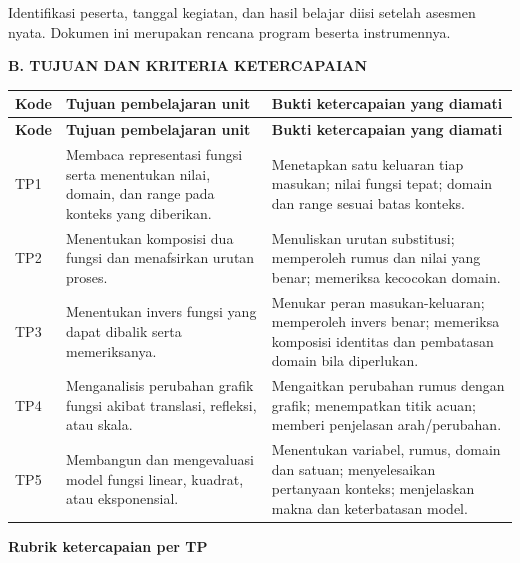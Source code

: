 \documentclass[11pt,a4paper]{article}
\begin{document}
{\small Identifikasi peserta, tanggal kegiatan, dan hasil belajar diisi setelah asesmen nyata. Dokumen ini merupakan rencana program beserta instrumennya.\par}\medskip
\clearpage
\begin{center}\bfseries\large B. TUJUAN DAN KRITERIA KETERCAPAIAN\end{center}\medskip
{\small\setlength{\tabcolsep}{2mm}\renewcommand{\arraystretch}{1.35}\begin{longtable}{|>{\raggedright\arraybackslash}p{16.269mm}|>{\raggedright\arraybackslash}p{67.787mm}|>{\raggedright\arraybackslash}p{81.344mm}|}\hline
\rowcolor{gray!10}\textbf{Kode} & \textbf{Tujuan pembelajaran unit} & \textbf{Bukti ketercapaian yang diamati}\\ \hline
\endfirsthead
\rowcolor{gray!10}\textbf{Kode} & \textbf{Tujuan pembelajaran unit} & \textbf{Bukti ketercapaian yang diamati}\\ \hline
\endhead
TP1 & Membaca representasi fungsi serta menentukan nilai, domain, dan range pada konteks yang diberikan. & Menetapkan satu keluaran tiap masukan; nilai fungsi tepat; domain dan range sesuai batas konteks.\\ \hline
TP2 & Menentukan komposisi dua fungsi dan menafsirkan urutan proses. & Menuliskan urutan substitusi; memperoleh rumus dan nilai yang benar; memeriksa kecocokan domain.\\ \hline
TP3 & Menentukan invers fungsi yang dapat dibalik serta memeriksanya. & Menukar peran masukan-keluaran; memperoleh invers benar; memeriksa komposisi identitas dan pembatasan domain bila diperlukan.\\ \hline
TP4 & Menganalisis perubahan grafik fungsi akibat translasi, refleksi, atau skala. & Mengaitkan perubahan rumus dengan grafik; menempatkan titik acuan; memberi penjelasan arah/perubahan.\\ \hline
TP5 & Membangun dan mengevaluasi model fungsi linear, kuadrat, atau eksponensial. & Menentukan variabel, rumus, domain dan satuan; menyelesaikan pertanyaan konteks; menjelaskan makna dan keterbatasan model.\\ \hline
\end{longtable}}\medskip
\par\medskip\noindent\textbf{Rubrik ketercapaian per TP}\par\smallskip
\end{document}

